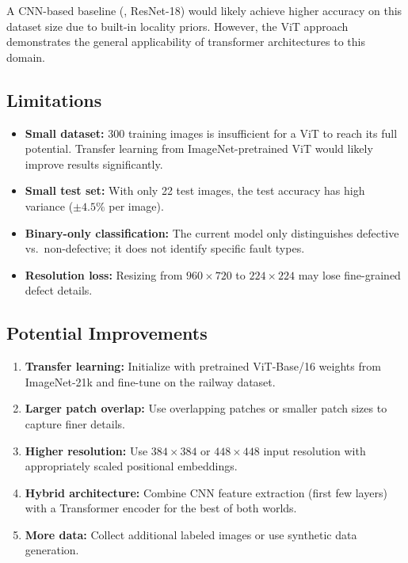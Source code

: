 \documentclass[10pt,twocolumn,letterpaper]{article}
\begin{document}
A CNN-based baseline (\eg, ResNet-18) would likely achieve higher accuracy on this dataset size due to built-in locality priors. However, the ViT approach demonstrates the general applicability of transformer architectures to this domain.

\subsection{Limitations}

\begin{itemize}
    \item \textbf{Small dataset:} 300 training images is insufficient for a ViT to reach its full potential. Transfer learning from ImageNet-pretrained ViT would likely improve results significantly.
    \item \textbf{Small test set:} With only 22 test images, the test accuracy has high variance ($\pm 4.5\%$ per image).
    \item \textbf{Binary-only classification:} The current model only distinguishes defective vs.\ non-defective; it does not identify specific fault types.
    \item \textbf{Resolution loss:} Resizing from $960 \times 720$ to $224 \times 224$ may lose fine-grained defect details.
\end{itemize}

\subsection{Potential Improvements}

\begin{enumerate}
    \item \textbf{Transfer learning:} Initialize with pretrained ViT-Base/16 weights from ImageNet-21k and fine-tune on the railway dataset.
    \item \textbf{Larger patch overlap:} Use overlapping patches or smaller patch sizes to capture finer details.
    \item \textbf{Higher resolution:} Use $384 \times 384$ or $448 \times 448$ input resolution with appropriately scaled positional embeddings.
    \item \textbf{Hybrid architecture:} Combine CNN feature extraction (first few layers) with a Transformer encoder for the best of both worlds.
    \item \textbf{More data:} Collect additional labeled images or use synthetic data generation.
\end{enumerate}
\end{document}
